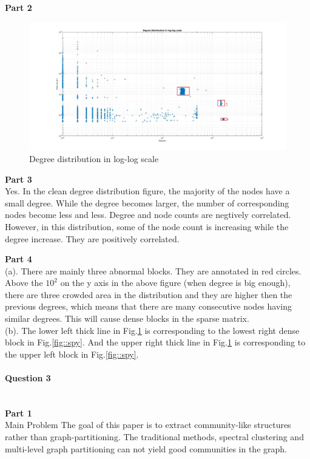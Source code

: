\documentclass[11pt]{article}
\begin{document}
\noindent
\textbf{Part 2} \\
\begin{figure}[H]
    \centering
    \includegraphics[width=\linewidth]{figs/q2.jpg}
    \caption{Degree distribution in log-log scale}
    \label{fig::deg_log}
\end{figure}

\noindent
\textbf{Part 3} \\
Yes. In the clean degree distribution figure, the majority of the nodes have a small degree. While the degree becomes larger, the number of corresponding nodes become less and less. Degree and node counts are negtively correlated. However, in this distribution, some of the node count is increasing while the degree increase. They are positively correlated.

\noindent
\textbf{Part 4} \\
(a). There are mainly three abnormal blocks. They are annotated in red circles. Above the $10^2$ on the y axis in the above figure (when degree is big enough), there are three crowded area in the distribution and they are higher then the previous degrees, which means that there are many consecutive nodes having similar degrees. This will cause dense blocks in the sparse matrix. \\
\noindent
(b). The lower left thick line in Fig.\ref{fig::deg_log} is corresponding to the lowest right dense block in Fig.\ref{fig::spy}. And the upper right thick line in Fig.\ref{fig::deg_log} is corresponding to the upper left block in Fig.\ref{fig::spy}.

\paragraph{Question 3}\mbox{} \\
\noindent
\textbf{Part 1} \\
\noindent
Main Problem \newline
The goal of this paper is to extract community-like structures rather than graph-partitioning. The traditional methods, spectral clustering and multi-level graph partitioning can not yield good communities in the graph.
\end{document}

